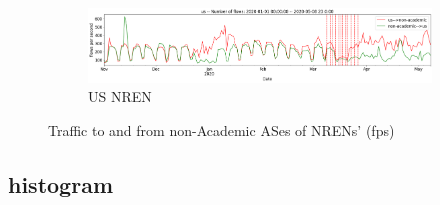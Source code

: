 \documentclass[10pt, journal, letterpaper]{IEEEtran}
\newcommand\linearFigSze{0.48}
\begin{document}
\begin{figure}
    \begin{subfigure}{\linearFigSze\textwidth}
          \centering
          \includegraphics[width=\columnwidth]{img/us_busi_fps.png}
          \caption{US NREN}
          \label{fig:US_busi_fps}
    \end{subfigure}
    \caption{Traffic to and from non-Academic ASes of NRENs' (fps)}
    \label{fig:nrens_busi_fps}
\end{figure}

\subsection{histogram}
\end{document}

